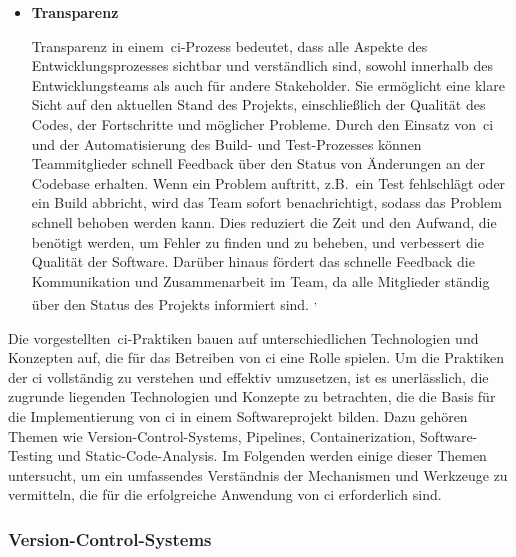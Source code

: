 \begin{itemize}
    \item {
        \textbf{Transparenz}\par
        Transparenz in einem\ \acrshort{ci}-Prozess bedeutet, dass alle Aspekte des Entwicklungsprozesses sichtbar und
        verständlich sind, sowohl innerhalb des Entwicklungsteams als auch für andere Stakeholder.
        Sie ermöglicht eine klare Sicht auf den aktuellen Stand des Projekts, einschließlich der Qualität des Codes,
        der Fortschritte und möglicher Probleme.
        Durch den Einsatz von\ \acrshort{ci} und der Automatisierung des Build- und Test-Prozesses können Teammitglieder
        schnell Feedback über den Status von Änderungen an der Codebase erhalten.
        Wenn ein Problem auftritt, z.B.\ ein Test fehlschlägt oder ein Build abbricht, wird das Team sofort
        benachrichtigt, sodass das Problem schnell behoben werden kann.
        Dies reduziert die Zeit und den Aufwand, die benötigt werden, um Fehler zu finden und zu beheben, und verbessert
        die Qualität der Software.
        Darüber hinaus fördert das schnelle Feedback die Kommunikation und Zusammenarbeit im Team, da alle Mitglieder
        ständig über den Status des Projekts informiert sind.
        \textsuperscript{,}
    }
\end{itemize}

Die vorgestellten\ \acrshort{ci}-Praktiken bauen auf unterschiedlichen Technologien und Konzepten auf, die für das
Betreiben von \acrlong{ci} eine Rolle spielen.
Um die Praktiken der \acrlong{ci} vollständig zu verstehen und effektiv umzusetzen, ist es
unerlässlich, die zugrunde liegenden Technologien und Konzepte zu betrachten, die die Basis für die Implementierung von
\acrshort{ci} in einem Softwareprojekt bilden.
Dazu gehören Themen wie Version-Control-Systems, Pipelines, Containerization, Software-Testing und
Static-Code-Analysis.
Im Folgenden werden einige dieser Themen untersucht, um ein umfassendes Verständnis der Mechanismen und Werkzeuge zu
vermitteln, die für die erfolgreiche Anwendung von \acrlong{ci} erforderlich sind.

\subsubsection{Version-Control-Systems}

